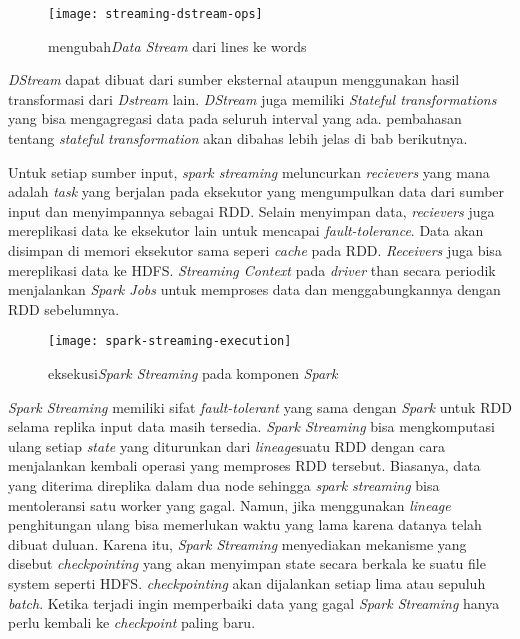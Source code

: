 \begin{figure}[H] 
	\centering  
	\texttt{[image: streaming-dstream-ops]}  
	\caption[Gambar mengubah{\it Data Stream} dari lines ke words]{mengubah{\it Data Stream} dari lines ke words} 
	\label{fig:processing-events relationship} 
	\end{figure}
	
\textit{DStream} dapat dibuat dari sumber eksternal ataupun menggunakan hasil transformasi dari \textit{Dstream} lain. \textit{DStream} juga memiliki  \textit{Stateful transformations} yang bisa mengagregasi data pada seluruh interval yang ada. pembahasan tentang \textit{stateful transformation} akan dibahas lebih jelas di bab berikutnya.

Untuk setiap sumber input, \textit{spark streaming} meluncurkan \textit{recievers} yang mana adalah \textit{task} yang berjalan pada eksekutor yang mengumpulkan data dari sumber input dan menyimpannya sebagai RDD. Selain menyimpan data, \textit{recievers} juga mereplikasi data ke eksekutor lain untuk mencapai \textit{fault-tolerance}. Data akan disimpan di memori eksekutor sama seperi \textit{cache} pada RDD. \textit{Receivers} juga bisa mereplikasi data ke HDFS. \textit{Streaming Context} pada \textit{driver} than secara periodik menjalankan \textit{Spark Jobs} untuk memproses data dan menggabungkannya dengan RDD sebelumnya.
  
\begin{figure}[H] 
	\centering  
	\texttt{[image: spark-streaming-execution]}  
	\caption[Gambar eksekusi{\it Spark Streaming} pada komponen \textit{Spark}]{eksekusi{\it Spark Streaming} pada komponen \textit{Spark}} 
	\label{fig:processing-events relationship} 
	\end{figure}

\textit{Spark Streaming} memiliki sifat \textit{fault-tolerant} yang sama dengan \textit{Spark} untuk RDD selama replika input data masih tersedia. \textit{Spark Streaming} bisa mengkomputasi ulang setiap \textit{state} yang diturunkan dari \textit{lineage}suatu RDD dengan cara menjalankan kembali operasi yang memproses RDD tersebut. Biasanya, data yang diterima direplika dalam dua node sehingga \textit{spark streaming} bisa mentoleransi satu worker yang gagal. Namun, jika menggunakan \textit{lineage} penghitungan ulang bisa memerlukan waktu yang lama karena datanya telah dibuat duluan. Karena itu, \textit{Spark Streaming} menyediakan mekanisme yang disebut \textit{checkpointing} yang akan menyimpan state secara berkala ke suatu file system seperti HDFS. \textit{checkpointing} akan dijalankan setiap lima atau sepuluh \textit{batch}. Ketika terjadi ingin memperbaiki data yang gagal \textit{Spark Streaming} hanya perlu kembali ke \textit{checkpoint} paling baru. 


